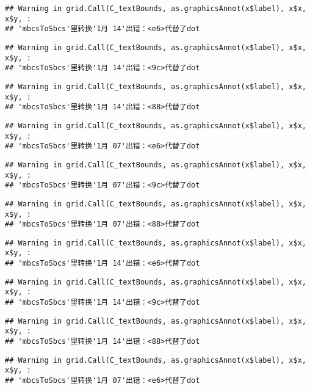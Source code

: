 \documentclass[
]{article}
\begin{document}
\begin{verbatim}
## Warning in grid.Call(C_textBounds, as.graphicsAnnot(x$label), x$x, x$y, :
## 'mbcsToSbcs'里转换'1月 14'出错：<e6>代替了dot
\end{verbatim}

\begin{verbatim}
## Warning in grid.Call(C_textBounds, as.graphicsAnnot(x$label), x$x, x$y, :
## 'mbcsToSbcs'里转换'1月 14'出错：<9c>代替了dot
\end{verbatim}

\begin{verbatim}
## Warning in grid.Call(C_textBounds, as.graphicsAnnot(x$label), x$x, x$y, :
## 'mbcsToSbcs'里转换'1月 14'出错：<88>代替了dot
\end{verbatim}

\begin{verbatim}
## Warning in grid.Call(C_textBounds, as.graphicsAnnot(x$label), x$x, x$y, :
## 'mbcsToSbcs'里转换'1月 07'出错：<e6>代替了dot
\end{verbatim}

\begin{verbatim}
## Warning in grid.Call(C_textBounds, as.graphicsAnnot(x$label), x$x, x$y, :
## 'mbcsToSbcs'里转换'1月 07'出错：<9c>代替了dot
\end{verbatim}

\begin{verbatim}
## Warning in grid.Call(C_textBounds, as.graphicsAnnot(x$label), x$x, x$y, :
## 'mbcsToSbcs'里转换'1月 07'出错：<88>代替了dot
\end{verbatim}

\begin{verbatim}
## Warning in grid.Call(C_textBounds, as.graphicsAnnot(x$label), x$x, x$y, :
## 'mbcsToSbcs'里转换'1月 14'出错：<e6>代替了dot
\end{verbatim}

\begin{verbatim}
## Warning in grid.Call(C_textBounds, as.graphicsAnnot(x$label), x$x, x$y, :
## 'mbcsToSbcs'里转换'1月 14'出错：<9c>代替了dot
\end{verbatim}

\begin{verbatim}
## Warning in grid.Call(C_textBounds, as.graphicsAnnot(x$label), x$x, x$y, :
## 'mbcsToSbcs'里转换'1月 14'出错：<88>代替了dot
\end{verbatim}

\begin{verbatim}
## Warning in grid.Call(C_textBounds, as.graphicsAnnot(x$label), x$x, x$y, :
## 'mbcsToSbcs'里转换'1月 07'出错：<e6>代替了dot
\end{verbatim}
\end{document}
